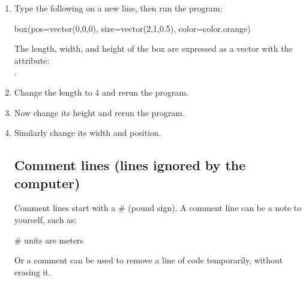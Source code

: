 \begin{enumerate}

	\item Type the following on a new line, then run the program:

\begin{myvpython}
box(pos=vector(0,0,0), size=vector(2,1,0.5), color=color.orange)
\end{myvpython}

The length, width, and height of the box are expressed as a vector with the attribute:\\
  .  

	\item Change the length to 4 and rerun the program.
	
	\item Now change its height and rerun the program.
	
	\item Similarly change its width and position.


	\subsection*{Comment lines (lines ignored by the computer)}

Comment lines start with a \# (pound sign). 
A comment line can be a note to yourself, such as:

\begin{myvpython}
# units are meters
\end{myvpython}

Or a comment can be used to remove a line of code temporarily, without erasing it.


\end{enumerate}
